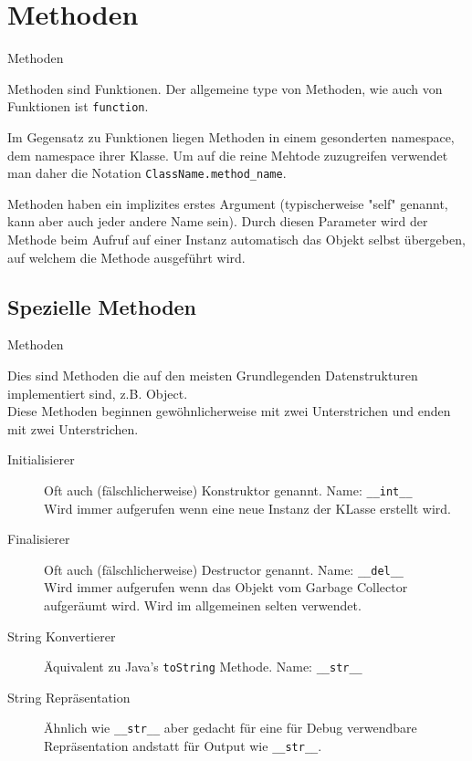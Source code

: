 \section{Methoden}
\begin{frame}{Methoden}

Methoden sind Funktionen. Der allgemeine type von Methoden, wie auch von Funktionen ist \texttt{function}. 

Im Gegensatz zu Funktionen liegen Methoden in einem gesonderten namespace, dem namespace ihrer Klasse. Um auf die reine Mehtode zuzugreifen verwendet man daher die Notation \texttt{ClassName.method_name}.

Methoden haben ein implizites erstes Argument (typischerweise "self" genannt, kann aber auch jeder andere Name sein). Durch diesen Parameter wird der Methode beim Aufruf auf einer Instanz automatisch das Objekt selbst übergeben, auf welchem die Methode ausgeführt wird.

\end{frame}

\subsection{Spezielle Methoden}
\begin{frame}{Methoden}

Dies sind Methoden die auf den meisten Grundlegenden Datenstrukturen implementiert sind, z.B. Object.\\
Diese Methoden beginnen gewöhnlicherweise mit zwei Unterstrichen und enden mit zwei Unterstrichen.

\begin{description}
	\item[Initialisierer] Oft auch (fälschlicherweise) Konstruktor genannt. Name: \texttt{__int__}\\
		Wird immer aufgerufen wenn eine neue Instanz der KLasse erstellt wird.
	\item[Finalisierer] Oft auch (fälschlicherweise) Destructor genannt. Name: \texttt{__del__}\\
		Wird immer aufgerufen wenn das Objekt vom Garbage Collector aufgeräumt wird. Wird im allgemeinen selten verwendet.
	\item[String Konvertierer] Äquivalent zu Java's \texttt{toString} Methode. Name: \texttt{__str__}
	\item[String Repräsentation] Ähnlich wie \texttt{__str__} aber gedacht für eine für Debug verwendbare Repräsentation andstatt für Output wie \texttt{__str__}.
\end{description}

\end{frame}


